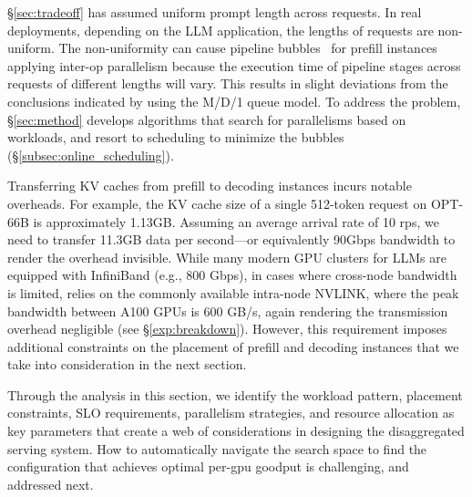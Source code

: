  \S\ref{sec:tradeoff} has assumed uniform prompt length across requests. In real deployments, depending on the LLM application, the lengths of requests are non-uniform. The non-uniformity can cause pipeline bubbles~\cite{huang2019gpipe,pipedream} for prefill instances applying inter-op parallelism because the execution time of pipeline stages across requests of different lengths will vary. This results in slight deviations from the conclusions indicated by using the M/D/1 queue model. To address the problem, \S\ref{sec:method} develops algorithms that search for parallelisms based on workloads, and resort to scheduling to minimize the bubbles (\S\ref{subsec:online_scheduling}).


Transferring KV caches from prefill to decoding instances incurs notable overheads. For example, the KV cache size of a single 512-token request on OPT-66B is approximately 1.13GB. Assuming an average arrival rate of 10 rps, we need to transfer 11.3GB data per second---or equivalently 90Gbps bandwidth to render the overhead invisible. While many modern GPU clusters for LLMs are equipped with InfiniBand (e.g., 800 Gbps), in cases where cross-node bandwidth is limited, \sys relies on the commonly available intra-node NVLINK, where the peak bandwidth between A100 GPUs is 600 GB/s, again rendering the transmission overhead negligible (see \S\ref{exp:breakdown}). However, this requirement imposes additional constraints on the placement of prefill and decoding instances that we take into consideration in the next section.


Through the analysis in this section, we identify the workload pattern, placement constraints, SLO requirements, parallelism strategies, and resource allocation as key parameters that create a web of considerations in designing the disaggregated serving system. How to automatically navigate the search space to find the configuration that achieves optimal per-gpu goodput is challenging, and addressed next.
